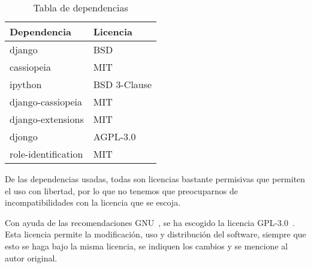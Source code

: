 \begin{table}[h]
	\centering
	\begin{tabular}{ll}\toprule
		\textbf{Dependencia}         & \textbf{Licencia}     \\ \midrule
		django              & BSD          \\
		cassiopeia          & MIT          \\
		ipython             & BSD 3-Clause \\
		django-cassiopeia   & MIT          \\
		django-extensions   & MIT          \\
		djongo              & AGPL-3.0     \\
		role-identification & MIT          \\ \bottomrule
	\end{tabular}
	\caption{Tabla de dependencias}
	\label{tab:dependencias}
\end{table}

De las dependencias usadas, todas son licencias bastante permisivas que permiten el uso con libertad, por lo que no tenemos que preocuparnos de incompatibilidades con la licencia que se escoja.

Con ayuda de las recomendaciones GNU~\cite{gnu-choose}, se ha escogido la licencia GPL-3.0~\cite{gpl3}. Esta licencia permite la modificación, uso y distribución del software, siempre que esto se haga bajo la misma licencia, se indiquen los cambios y se mencione al autor original.


